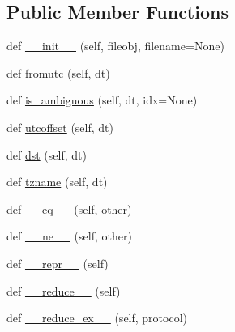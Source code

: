\subsection*{Public Member Functions}
\begin{DoxyCompactItemize}
\item 
def \hyperlink{classdateutil_1_1tz_1_1tz_1_1tzfile_ab69d4b19e76529f70b57573027839e99}{\+\_\+\+\_\+init\+\_\+\+\_\+} (self, fileobj, filename=None)
\item 
def \hyperlink{classdateutil_1_1tz_1_1tz_1_1tzfile_a8c6d4edca5ed781e176a92ccca3cfb6b}{fromutc} (self, dt)
\item 
def \hyperlink{classdateutil_1_1tz_1_1tz_1_1tzfile_a3b1d738119ae0027df8735c886c0d154}{is\+\_\+ambiguous} (self, dt, idx=None)
\item 
def \hyperlink{classdateutil_1_1tz_1_1tz_1_1tzfile_a958135319a0ba1cca1949b48c65f4c93}{utcoffset} (self, dt)
\item 
def \hyperlink{classdateutil_1_1tz_1_1tz_1_1tzfile_a5a7e65b60111a3df7366852a72d00457}{dst} (self, dt)
\item 
def \hyperlink{classdateutil_1_1tz_1_1tz_1_1tzfile_adcc1cb91aeb3064b12d54ee4a57ac38f}{tzname} (self, dt)
\item 
def \hyperlink{classdateutil_1_1tz_1_1tz_1_1tzfile_a51e376f853af97b8db20702c26b97c3d}{\+\_\+\+\_\+eq\+\_\+\+\_\+} (self, other)
\item 
def \hyperlink{classdateutil_1_1tz_1_1tz_1_1tzfile_a6b9160a0bf48fff0fec46b770e6873c7}{\+\_\+\+\_\+ne\+\_\+\+\_\+} (self, other)
\item 
def \hyperlink{classdateutil_1_1tz_1_1tz_1_1tzfile_a632cdefdc1134bfb153828c88605a55d}{\+\_\+\+\_\+repr\+\_\+\+\_\+} (self)
\item 
def \hyperlink{classdateutil_1_1tz_1_1tz_1_1tzfile_a31cbe77d6e922e2e0abd9d8bbc954d56}{\+\_\+\+\_\+reduce\+\_\+\+\_\+} (self)
\item 
def \hyperlink{classdateutil_1_1tz_1_1tz_1_1tzfile_a63da6aeab6b64c519054fd0cb90f2fe0}{\+\_\+\+\_\+reduce\+\_\+ex\+\_\+\+\_\+} (self, protocol)
\end{DoxyCompactItemize}


